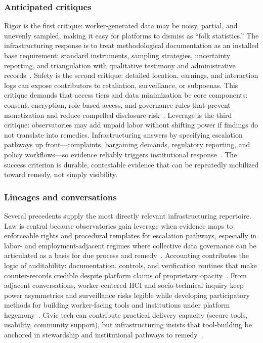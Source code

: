 \documentclass[acmsmall,screen]{acmart}
\begin{document}
\subsubsection*{Anticipated critiques}
Rigor is the first critique: worker-generated data may be noisy, partial, and unevenly sampled, making it easy for platforms to dismiss as ``folk statistics.'' The infrastructuring response is to treat methodological documentation as an installed base requirement: standard instruments, sampling strategies, uncertainty reporting, and triangulation with qualitative testimony and administrative records~\cite{dalalLessonsWorkersInquiry2024,calacciBargainingBlackBoxDesigning2022}. Safety is the second critique: detailed location, earnings, and interaction logs can expose contributors to retaliation, surveillance, or subpoenas. This critique demands that access tiers and data minimization be core components: consent, encryption, role-based access, and governance rules that prevent monetization and reduce compelled disclosure risk~\cite{doDesigningGigWorker2024,steinYouAreYou2023}. Leverage is the third critique: observatories may add unpaid labor without shifting power if findings do not translate into remedies. Infrastructuring answers by specifying escalation pathways up front—complaints, bargaining demands, regulatory reporting, and policy workflows—so evidence reliably triggers institutional response~\cite{vincentDataLeverageFramework2021a,calacciOrganizingEndEmployment2022,nagarajraoRideshareTransparencyTranslating2025}. The success criterion is durable, contestable evidence that can be repeatedly mobilized toward remedy, not simply visibility.

\subsubsection*{Lineages and conversations}
Several precedents supply the most directly relevant infrastructuring repertoire. Law is central because observatories gain leverage when evidence maps to enforceable rights and procedural templates for escalation pathways, especially in labor- and employment-adjacent regimes where collective data governance can be articulated as a basis for due process and remedy~\cite{calacciAccessUnderstandingCollective2023}. Accounting contributes the logic of auditability: documentation, controls, and verification routines that make counter-records credible despite platform claims of proprietary opacity~\cite{calacciBargainingBlackBoxDesigning2022,binnsNotEvenNice2025}. From adjacent conversations, worker-centered HCI and socio-technical inquiry keep power asymmetries and surveillance risks legible while developing participatory methods for building worker-facing tools and institutions under platform hegemony~\cite{steinYouAreYou2023,zhangStakeholderCenteredAIDesign2023}. Civic tech can contribute practical delivery capacity (secure tools, usability, community support), but infrastructuring insists that tool-building be anchored in stewardship and institutional pathways to remedy~\cite{hsiehGig2GetherDatasharingEmpower2025,doDesigningGigWorker2024}.
\end{document}
